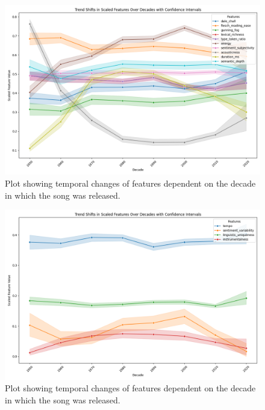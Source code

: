 \begin{center}
\begin{figure}[H]
  \centering
  \includegraphics[width=6in]{img/temporal_trends_2.png}
  \caption{Plot showing temporal changes of features dependent on the decade in
  which the song was released.}
  \label{Figure:trends2}
\end{figure}
\end{center}

\begin{center}
\begin{figure}[H]
  \centering
  \includegraphics[width=6in]{img/temporal_trends_3.png}
  \caption{Plot showing temporal changes of features dependent on the decade in
  which the song was released.}
  \label{Figure:trends3}
\end{figure}
\end{center}

